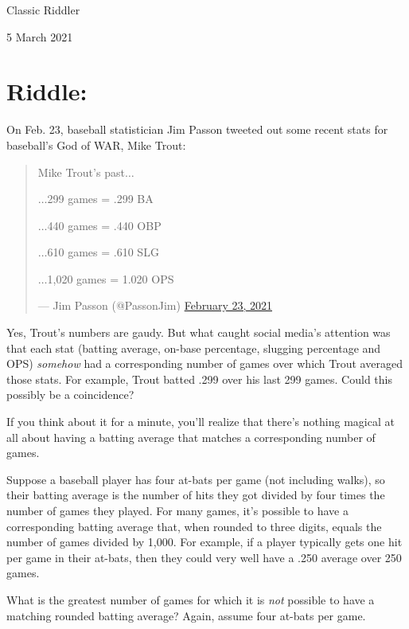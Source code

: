 \documentclass{article}
\begin{document}
\pagestyle{empty} %

\begin{center}
{\LARGE Classic Riddler}

\vspace{0.15in}

{\Large 5 March 2021}
\end{center}


\section*{Riddle:}

On Feb. 23, baseball statistician Jim Passon tweeted out some recent stats for baseball's God of WAR, Mike Trout:

\begin{quote}
Mike Trout's past$\dots$

$\dots$299 games = .299 BA

$\dots$440 games = .440 OBP

$\dots$610 games = .610 SLG

$\dots$1,020 games = 1.020 OPS

— Jim Passon (@PassonJim) \href{https://twitter.com/PassonJim/status/1364086333581393923}{February 23, 2021}
\end{quote}

Yes, Trout's numbers are gaudy.
But what caught social media's attention was that each stat (batting average, on-base percentage, slugging percentage and OPS) \textit{somehow} had a corresponding number of games over which Trout averaged those stats.
For example, Trout batted .299 over his last 299 games. Could this possibly be a coincidence?

If you think about it for a minute, you'll realize that there's nothing magical at all about having a batting average that matches a corresponding number of games.

Suppose a baseball player has four at-bats per game (not including walks), so their batting average is the number of hits they got divided by four times the number of games they played.
For many games, it's possible to have a corresponding batting average that, when rounded to three digits, equals the number of games divided by 1,000.
For example, if a player typically gets one hit per game in their at-bats, then they could very well have a .250 average over 250 games.

What is the greatest number of games for which it is \textit{not} possible to have a matching rounded batting average?
Again, assume four at-bats per game.
\end{document}
